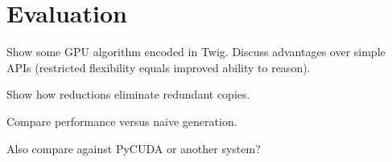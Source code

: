 
\section{Evaluation}

Show some GPU algorithm encoded in Twig. Discuss advantages over simple APIs
(restricted flexibility equals improved ability to reason).

Show how reductions eliminate redundant copies.

Compare performance versus naive generation.

Also compare against PyCUDA or another system?
